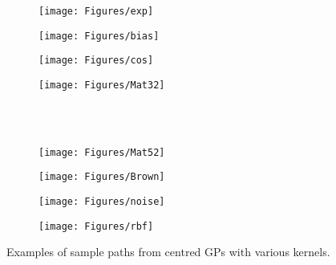 \documentclass{article}
\begin{document}
\begin{figure}
	\begin{center}
        \begin{subfigure}[b]{0.2\textwidth}
                \centering
                \texttt{[image: Figures/exp]}
                \caption{}
        \end{subfigure}%
        \begin{subfigure}[b]{0.2\textwidth}
                \centering
                \texttt{[image: Figures/bias]}
                \caption{}
        \end{subfigure}%
        \begin{subfigure}[b]{0.2\textwidth}
                \centering
                \texttt{[image: Figures/cos]}
                \caption{}
        \end{subfigure}%
        \begin{subfigure}[b]{0.2\textwidth}
                \centering
                \texttt{[image: Figures/Mat32]}
                \caption{}
        \end{subfigure} \\ \ \\
        \begin{subfigure}[b]{0.2\textwidth}
                \centering
                \texttt{[image: Figures/Mat52]}
                \caption{}
        \end{subfigure}%
        \begin{subfigure}[b]{0.2\textwidth}
                \centering
                \texttt{[image: Figures/Brown]}
                \caption{}
        \end{subfigure}%
        \begin{subfigure}[b]{0.2\textwidth}
                \centering
                \texttt{[image: Figures/noise]}
                \caption{}
        \end{subfigure}%
        \begin{subfigure}[b]{0.2\textwidth}
                \centering
                \texttt{[image: Figures/rbf]}
                \caption{}
        \end{subfigure}
    \end{center}
    \caption{Examples of sample paths from centred GPs with various kernels.}
	\label{fig:paths}
\end{figure}

\end{document}
